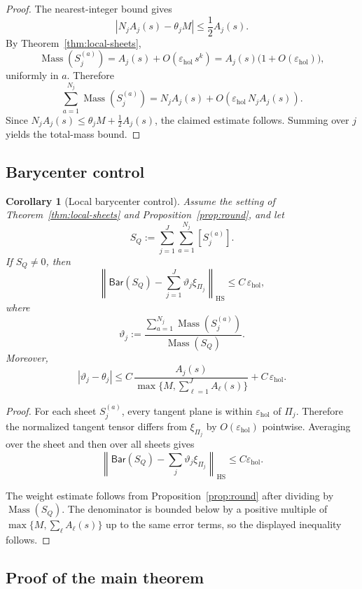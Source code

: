 \documentclass[11pt]{article}
\numberwithin{equation}{section}
\theoremstyle{plain}
\newtheorem{corollary}[theorem]{Corollary}
\theoremstyle{definition}
\theoremstyle{remark}
\DeclareMathOperator{\Mass}{Mass}
\newcommand{\eps}{\varepsilon}
\newcommand{\HS}{\mathrm{HS}}
\begin{document}
\begin{proof}
The nearest-integer bound gives
\[
|N_jA_j(s)-\theta_j M| \le \frac12A_j(s).
\]
By Theorem~\ref{thm:local-sheets},
\[
\Mass(S_j^{(a)}) = A_j(s) + O(\eps_{\mathrm{hol}}\,s^k)
=
A_j(s)\bigl(1+O(\eps_{\mathrm{hol}})\bigr),
\]
uniformly in $a$.  Therefore
\[
\sum_{a=1}^{N_j}\Mass(S_j^{(a)})
=
N_jA_j(s) + O(\eps_{\mathrm{hol}}\,N_jA_j(s)).
\]
Since $N_jA_j(s)\le \theta_j M + \frac12A_j(s)$, the claimed estimate follows.  Summing over $j$ yields the total-mass bound.
\end{proof}

\subsection{Barycenter control}

\begin{corollary}[Local barycenter control]\label{cor:bary}
Assume the setting of Theorem~\ref{thm:local-sheets} and Proposition~\ref{prop:round}, and let
\[
S_Q := \sum_{j=1}^J\sum_{a=1}^{N_j}[S_j^{(a)}].
\]
If $S_Q\neq 0$, then
\[
\left\|
\mathsf{Bar}(S_Q)
-
\sum_{j=1}^J \vartheta_j \xi_{\Pi_j}
\right\|_{\HS}
\le
C\,\eps_{\mathrm{hol}},
\]
where
\[
\vartheta_j
:=
\frac{\sum_{a=1}^{N_j}\Mass(S_j^{(a)})}{\Mass(S_Q)}.
\]
Moreover,
\[
\left|
\vartheta_j-\theta_j
\right|
\le
C\,\frac{A_j(s)}{\max\{M,\sum_{\ell=1}^J A_\ell(s)\}}
+
C\,\eps_{\mathrm{hol}}.
\]
\end{corollary}

\begin{proof}
For each sheet $S_j^{(a)}$, every tangent plane is within $\eps_{\mathrm{hol}}$ of $\Pi_j$.  Therefore the normalized tangent tensor differs from $\xi_{\Pi_j}$ by $O(\eps_{\mathrm{hol}})$ pointwise.  Averaging over the sheet and then over all sheets gives
\[
\left\|
\mathsf{Bar}(S_Q)-\sum_j \vartheta_j \xi_{\Pi_j}
\right\|_{\HS}
\le C\eps_{\mathrm{hol}}.
\]

The weight estimate follows from Proposition~\ref{prop:round} after dividing by $\Mass(S_Q)$.  The denominator is bounded below by a positive multiple of $\max\{M,\sum_\ell A_\ell(s)\}$ up to the same error terms, so the displayed inequality follows.
\end{proof}

\subsection{Proof of the main theorem}
\end{document}
